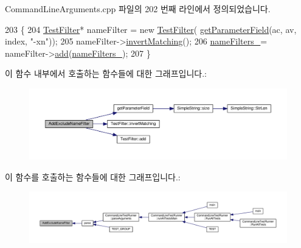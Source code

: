 Command\+Line\+Arguments.\+cpp 파일의 202 번째 라인에서 정의되었습니다.


\begin{DoxyCode}
203 \{
204     \hyperlink{class_test_filter}{TestFilter}* nameFilter = \textcolor{keyword}{new} \hyperlink{class_test_filter}{TestFilter}(
      \hyperlink{class_command_line_arguments_acea2499d001a6bd1a67c2ece97a5632c}{getParameterField}(ac, av, index, \textcolor{stringliteral}{"-xn"}));
205     nameFilter->\hyperlink{class_test_filter_a1a66fe42927a04f354a09ebcacb54309}{invertMatching}();
206     \hyperlink{class_command_line_arguments_ad2305aa697f8aab0ff0cbe9de842da56}{nameFilters\_}= nameFilter->\hyperlink{class_test_filter_ae532a4739c31605009dfd14f374c8a69}{add}(\hyperlink{class_command_line_arguments_ad2305aa697f8aab0ff0cbe9de842da56}{nameFilters\_});
207 \}
\end{DoxyCode}


이 함수 내부에서 호출하는 함수들에 대한 그래프입니다.\+:
\nopagebreak
\begin{figure}[H]
\begin{center}
\leavevmode
\includegraphics[width=350pt]{class_command_line_arguments_a76cc113a87e1d2a409218ddb50a7dd5e_cgraph}
\end{center}
\end{figure}




이 함수를 호출하는 함수들에 대한 그래프입니다.\+:
\nopagebreak
\begin{figure}[H]
\begin{center}
\leavevmode
\includegraphics[width=350pt]{class_command_line_arguments_a76cc113a87e1d2a409218ddb50a7dd5e_icgraph}
\end{center}
\end{figure}


